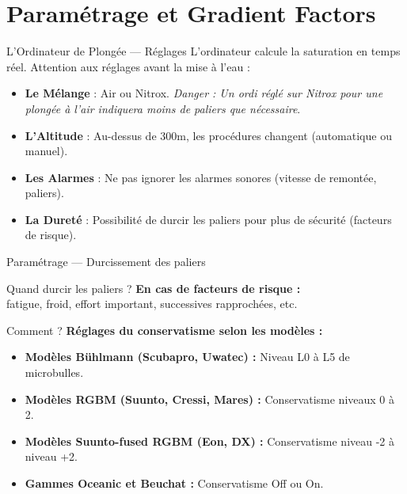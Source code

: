 \section{Paramétrage et Gradient Factors}

\begin{frame}{L'Ordinateur de Plongée — Réglages}
    L'ordinateur calcule la saturation en temps réel. Attention aux réglages avant la mise à l'eau :
    \begin{itemize}
        \item \textbf{Le Mélange} : Air ou Nitrox. \textit{\textcolor{ffessmred}{Danger} : Un ordi réglé sur Nitrox 
            pour une plongée à l'air indiquera moins de paliers que nécessaire}.
        \item \textbf{L'Altitude} : Au-dessus de 300m, les procédures changent (automatique ou manuel).
        \item \textbf{Les Alarmes} : Ne pas ignorer les alarmes sonores (vitesse de remontée, paliers).
        \item \textbf{La Dureté} : Possibilité de durcir les paliers pour plus de sécurité 
            (facteurs de risque).
    \end{itemize}
\end{frame}

\begin{frame}{Paramétrage — Durcissement des paliers}
    
    \begin{alertblock}{Quand durcir les paliers ?}
    \textbf{En cas de facteurs de risque :} \\
    fatigue, froid, effort important, successives rapprochées, etc.
    \end{alertblock}
    \begin{exampleblock}{Comment ?}
        \textbf{Réglages du conservatisme selon les modèles :}
        \begin{itemize}
            \item \textbf{Modèles Bühlmann (Scubapro, Uwatec) :} Niveau L0 à L5 de microbulles.
            \item \textbf{Modèles RGBM (Suunto, Cressi, Mares) :} Conservatisme niveaux 0 à 2.
            \item \textbf{Modèles Suunto-fused RGBM (Eon, DX) :} Conservatisme niveau -2 à niveau +2.
            \item \textbf{Gammes Oceanic et Beuchat :} Conservatisme Off ou On.
        \end{itemize}
    \end{exampleblock}
\end{frame}

